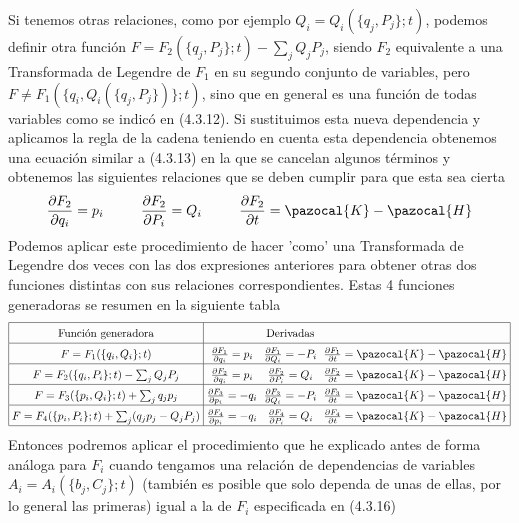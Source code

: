 Si tenemos otras relaciones, como por ejemplo $Q_i=Q_i(\{q_j,P_j\};t)$, podemos definir otra función $F = F_2(\{q_j,P_j\};t) - \sum_j Q_j P_j$, siendo $F_2$ equivalente a una Transformada de Legendre de $F_1$ en su segundo conjunto de variables, pero $F \neq F_1(\{q_i,Q_i(\{q_j,P_j\})\};t)$, sino que en general es una función de todas variables como se indicó en (4.3.12). Si sustituimos esta nueva dependencia y aplicamos la regla de la cadena teniendo en cuenta esta dependencia obtenemos una ecuación similar a (4.3.13) en la que se cancelan algunos términos y obtenemos las siguientes relaciones que se deben cumplir para que esta sea cierta
\begin{equation} \label{4.2.7}
    \frac{\partial F_2}{\partial q_i} = p_i \ \ \ \ \ \ \ \ \frac{\partial F_2}{\partial P_i} = Q_i \ \ \ \ \ \ \ \ \frac{\partial F_2}{\partial t} = \pazocal{K}-\pazocal{H}
\end{equation} 
Podemos aplicar este procedimiento de hacer 'como' una Transformada de Legendre dos veces con las dos expresiones anteriores para obtener otras dos funciones distintas con sus relaciones correspondientes. Estas 4 funciones generadoras se resumen en la siguiente tabla
\begin{equation} \label{4.2.7}
        \arraycolsep=3pt\def\arraystretch{1.5}
        \begin{array}{|c|ccc|} \hline \mbox{Función generadora} & & \mbox{Derivadas} & \\ \hline 
            F = F_1(\{q_i,Q_i\};t) & \frac{\partial F_1}{\partial q_i} = p_i &  \frac{\partial F_1}{\partial Q_i} = -P_i & \frac{\partial F_1}{\partial t} = \pazocal{K}-\pazocal{H} \\ \hline 
            F = F_2(\{q_i,P_i\};t) -\sum_j Q_j P_j& \frac{\partial F_2}{\partial q_i} = p_i &  \frac{\partial F_2}{\partial P_i} = Q_i  & \frac{\partial F_2}{\partial t} = \pazocal{K}-\pazocal{H} \\ \hline 
            F = F_3(\{p_i,Q_i\};t) +\sum_j q_j p_j& \frac{\partial F_3}{\partial p_i} = -q_i &  \frac{\partial F_3}{\partial Q_i} = -P_i  & \frac{\partial F_3}{\partial t} = \pazocal{K}-\pazocal{H}\\ \hline 
            F = F_4(\{p_i,P_i\};t) +\sum_j (q_j p_j - Q_j P_j)& \frac{\partial F_4}{\partial p_i} = -q_i & \frac{\partial F_4}{\partial P_i} = Q_i  & \frac{\partial F_4}{\partial t} = \pazocal{K}-\pazocal{H}\\ \hline 
        \end{array}
\end{equation} 
Entonces podremos aplicar el procedimiento que he explicado antes de forma análoga para $F_i$ cuando tengamos una relación de dependencias de variables $A_i=A_i(\{b_j,C_j\};t)$ (también es posible que solo dependa de unas de ellas, por lo general las primeras) igual a la de $F_i$ especificada en (4.3.16)

